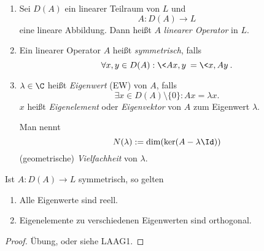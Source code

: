 \begin{df} \label{1.17}
	\begin{enumerate}[1)]
		\item
			Sei $D(A)$ ein linearer Teilraum von $L$ und
			\[
				A : D(A) \to L
			\]
			eine lineare Abbildung. 
			Dann heißt $A$ \emph{linearer Operator} in $L$.
		\item
			Ein linearer Operator $A$ heißt \emph{symmetrisch}, falls
			\[
				\forall x,y \in D(A) : \<Ax,y\> = \<x,Ay\>.
			\]
		\item
			$\lambda \in \C$ heißt \emph{Eigenwert} (EW) von $A$, falls
			\[
				\exists x \in D(A) \setminus \{0\} : Ax = \lambda x.
			\]
			$x$ heißt \emph{Eigenelement} oder \emph{Eigenvektor} von $A$ zum Eigenwert $\lambda$.

			Man nennt
			\[
				N(\lambda) := \dim (\ker(A-\lambda \Id))
			\]
			(geometrische) \emph{Vielfachheit} von $\lambda$.
	\end{enumerate}
\end{df}

\begin{st} \label{1.18}
	Ist $A: D(A) \to L$ symmetrisch, so gelten
	\begin{enumerate}[1)]
		\item
			Alle Eigenwerte sind reell.
		\item
			Eigenelemente zu verschiedenen Eigenwerten sind orthogonal.
	\end{enumerate}
	\begin{proof}
		Übung, oder siehe LAAG1.
	\end{proof}
\end{st}

